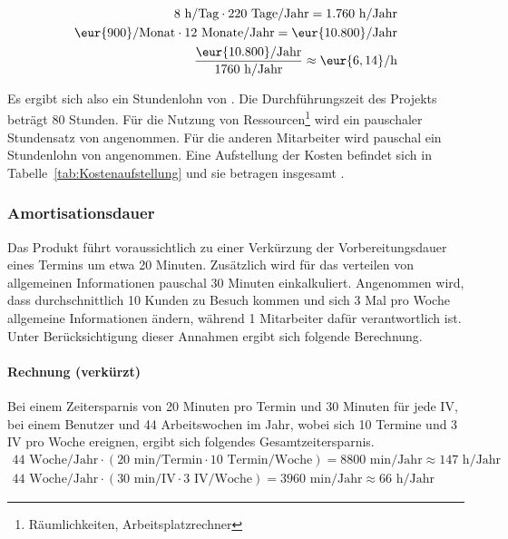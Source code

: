 \begin{eqnarray}
8 \mbox{ h/Tag} \cdot 220 \mbox{ Tage/Jahr} = 1.760 \mbox{ h/Jahr}\\
\eur{900}\mbox{/Monat} \cdot 12 \mbox{ Monate/Jahr} = \eur{10.800} \mbox{/Jahr}\\
\frac{\eur{10.800} \mbox{/Jahr}}{1760 \mbox{ h/Jahr}} \approx \eur{6,14}\mbox{/h}
\end{eqnarray}

Es ergibt sich also ein Stundenlohn von .
Die Durchführungszeit des Projekts beträgt 80 Stunden. Für die Nutzung von Ressourcen\footnote{Räumlichkeiten, Arbeitsplatzrechner \etc} wird
ein pauschaler Stundensatz von  angenommen. Für die anderen Mitarbeiter wird pauschal ein Stundenlohn von  angenommen.
Eine Aufstellung der Kosten befindet sich in Tabelle~\ref{tab:Kostenaufstellung} und sie betragen insgesamt .


\subsubsection{Amortisationsdauer}
\label{sec:Amortisationsdauer}
Das Produkt führt voraussichtlich zu einer Verkürzung der Vorbereitungsdauer eines Termins um etwa 20 Minuten.
Zusätzlich wird für das verteilen von allgemeinen Informationen pauschal 30 Minuten einkalkuliert.
Angenommen wird, dass durchschnittlich 10 Kunden zu Besuch kommen und sich 3 Mal pro Woche allgemeine Informationen ändern, während 1 Mitarbeiter dafür verantwortlich ist.
Unter Berücksichtigung dieser Annahmen ergibt sich folgende Berechnung.

\paragraph{Rechnung (verkürzt)}
Bei einem Zeitersparnis von 20 Minuten pro Termin und 30 Minuten für jede \ac{IV}, bei einem Benutzer und 44 Arbeitswochen im Jahr, wobei sich 10 Termine und 3 \ac{IV} pro Woche ereignen, ergibt sich folgendes Gesamtzeitersparnis.
\begin{eqnarray}
44 \mbox{ Woche/Jahr} \cdot (20 \mbox{ min/Termin} \cdot 10 \mbox{ Termin/Woche}) = 8800 \mbox{ min/Jahr} \approx 147 \mbox{ h/Jahr}\\
44 \mbox{ Woche/Jahr} \cdot (30 \mbox{ min/IV} \cdot 3 \mbox{ IV/Woche}) = 3960 \mbox{ min/Jahr} \approx 66 \mbox{ h/Jahr}
\end{eqnarray}

